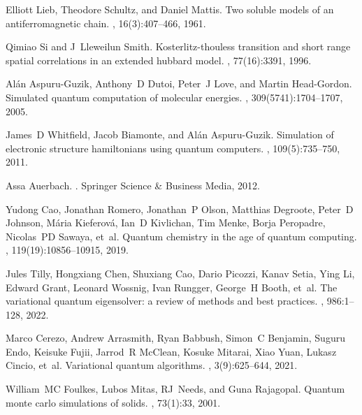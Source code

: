 \documentclass[showpacs,onecolumn,aps,prx,long bibliography,superscriptaddress,notitlepage]{revtex4-1}
\begin{document}
\begin{thebibliography}{10}

Elliott Lieb, Theodore Schultz, and Daniel Mattis.
\newblock Two soluble models of an antiferromagnetic chain.
, 16(3):407--466, 1961.

Qimiao Si and J~Lleweilun Smith.
\newblock Kosterlitz-thouless transition and short range spatial correlations
  in an extended hubbard model.
, 77(16):3391, 1996.

Al{\'a}n Aspuru-Guzik, Anthony~D Dutoi, Peter~J Love, and Martin Head-Gordon.
\newblock Simulated quantum computation of molecular energies.
, 309(5741):1704--1707, 2005.

James~D Whitfield, Jacob Biamonte, and Al{\'a}n Aspuru-Guzik.
\newblock Simulation of electronic structure hamiltonians using quantum
  computers.
, 109(5):735--750, 2011.

Assa Auerbach.
.
\newblock Springer Science \& Business Media, 2012.

Yudong Cao, Jonathan Romero, Jonathan~P Olson, Matthias Degroote, Peter~D
  Johnson, M{\'a}ria Kieferov{\'a}, Ian~D Kivlichan, Tim Menke, Borja
  Peropadre, Nicolas~PD Sawaya, et~al.
\newblock Quantum chemistry in the age of quantum computing.
, 119(19):10856--10915, 2019.

Jules Tilly, Hongxiang Chen, Shuxiang Cao, Dario Picozzi, Kanav Setia, Ying Li,
  Edward Grant, Leonard Wossnig, Ivan Rungger, George~H Booth, et~al.
\newblock The variational quantum eigensolver: a review of methods and best
  practices.
, 986:1--128, 2022.

Marco Cerezo, Andrew Arrasmith, Ryan Babbush, Simon~C Benjamin, Suguru Endo,
  Keisuke Fujii, Jarrod~R McClean, Kosuke Mitarai, Xiao Yuan, Lukasz Cincio,
  et~al.
\newblock Variational quantum algorithms.
, 3(9):625--644, 2021.

William~MC Foulkes, Lubos Mitas, RJ~Needs, and Guna Rajagopal.
\newblock Quantum monte carlo simulations of solids.
, 73(1):33, 2001.


\end{thebibliography}
\end{document}
